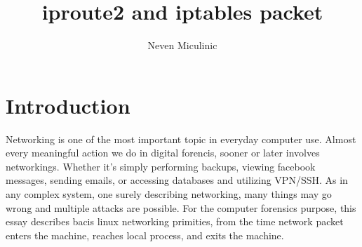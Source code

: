 \documentclass[times, utf8, seminar, english]{fer}
\begin{document}
\theoremstyle{definition}
\newtheorem{definition}{Definition}[section]
\title{iproute2 and iptables packet}
\author{Neven Miculinic}

\maketitle
\tableofcontents


\chapter{Introduction}

Networking is one of the most important topic in everyday computer use. Almost every meaningful action we do in digital forencis, sooner or later involves networkings. Whether it's simply performing backups, viewing facebook messages, sending emails, or accessing databases and utilizing VPN/SSH.
As in any complex system, one surely describing networking, many things may go wrong and multiple attacks are possible. For the computer forensics purpose, this essay describes bacis linux networking primities, from the time network packet enters the machine, reaches local process, and exits the machine.
\end{document}
